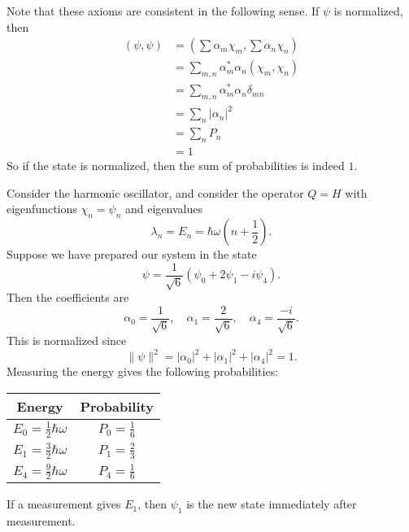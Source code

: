 \documentclass[a4paper]{article}
\begin{document}
Note that these axioms are consistent in the following sense. If $\psi$ is normalized, then
\begin{align*}
  (\psi, \psi) &= \left(\sum \alpha_m \chi_m, \sum \alpha_n \chi_n\right)\\
  &= \sum_{m, n} \alpha_m^* \alpha_n (\chi_m, \chi_n)\\
  &= \sum_{m, n} \alpha_m^* \alpha_n \delta_{mn}\\
  &= \sum_n |\alpha_n|^2\\
  &= \sum_n P_n\\
  &= 1
\end{align*}
So if the state is normalized, then the sum of probabilities is indeed $1$.

\begin{eg}
  Consider the harmonic oscillator, and consider the operator $Q = H$ with eigenfunctions $\chi_n = \psi_n$ and eigenvalues
  \[
    \lambda_n = E_n = \hbar \omega \left(n + \frac{1}{2}\right).
  \]
  Suppose we have prepared our system in the state
  \[
    \psi = \frac{1}{\sqrt{6}}(\psi_0 + 2\psi_1 - i \psi_4).
  \]
  Then the coefficients are
  \[
    \alpha_0 = \frac{1}{\sqrt{6}},\quad \alpha_1 = \frac{2}{\sqrt{6}},\quad \alpha_4 = \frac{-i}{\sqrt{6}}.
  \]
  This is normalized since
  \[
    \|\psi\|^2 = |\alpha_0|^2 + |\alpha_1|^2 + |\alpha_4|^2 = 1.
  \]
  Measuring the energy gives the following probabilities:
  \begin{center}
    \begin{tabular}{cc}
      \toprule
      \textbf{Energy} & \textbf{Probability}\\
      \midrule
      $\displaystyle E_0 = \frac{1}{2} \hbar \omega$ & $\displaystyle P_0 = \frac{1}{6}$\\\addlinespace
      $\displaystyle E_1 = \frac{3}{2} \hbar \omega$ & $\displaystyle P_1 = \frac{2}{3}$\\\addlinespace
      $\displaystyle E_4 = \frac{9}{2} \hbar \omega$ & $\displaystyle P_4 = \frac{1}{6}$\\
      \bottomrule
    \end{tabular}
  \end{center}
  If a measurement gives $E_1$, then $\psi_1$ is the new state immediately after measurement.
\end{eg}
\end{document}

